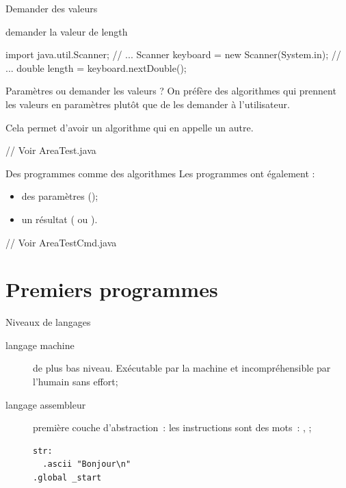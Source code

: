 \begin{hideedit}
\begin{frame}[fragile]{Demander des valeurs}
\begin{langagenaturel}
    demander la valeur de length
  \end{langagenaturel}

  \pause
  \begin{java}
import java.util.Scanner;
// ...
Scanner keyboard = new Scanner(System.in);
// ...
double length = keyboard.nextDouble();
  \end{java}
\end{frame}

\begin{frame}[fragile]{Paramètres ou demander les valeurs ?}
  On préfère des algorithmes qui prennent les valeurs en paramètres plutôt que
  de les demander à l'utilisateur.

  Cela permet d'avoir un \alert{algorithme qui en appelle un autre}.

  \vfill

  \pause
  \begin{java}
    // Voir AreaTest.java
  \end{java}
\end{frame}

\begin{frame}[fragile]{Des programmes comme des algorithmes}
  Les programmes ont également :
  \begin{itemize}
    \item des paramètres ();
    \item un résultat ( ou ).
  \end{itemize}

  \vfill

  \pause
  \begin{java}
    // Voir AreaTestCmd.java
  \end{java}
\end{frame}

\section{Premiers programmes}
\frame{\sectionpage}
\begin{frame}[fragile]{Niveaux de langages}
  \begin{description}
    \item[langage machine]
      de plus bas niveau. Exécutable par la machine et incompréhensible
      par l'humain sans effort;

    \item[langage assembleur]
      première couche d'abstraction~: les instructions
      sont des mots~: , ;
      {\footnotesize
      \begin{verbatim}
str:
  .ascii "Bonjour\n"
.global _start


\end{verbatim}}
\end{description}
\end{frame}
\end{hideedit}
